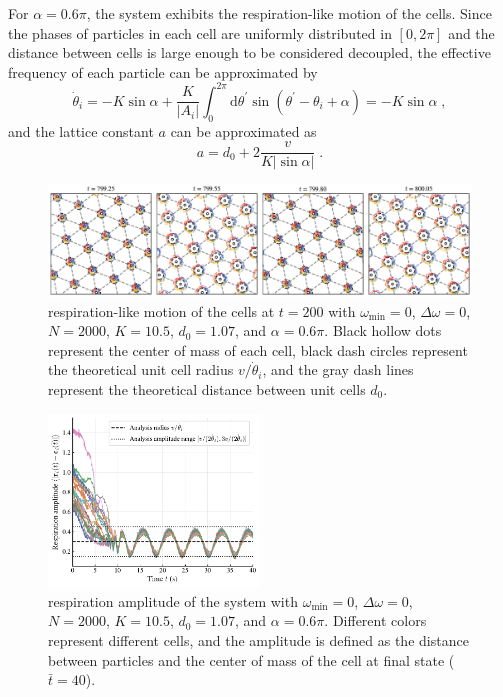 \documentclass{article}
\begin{document}
For $\alpha=0.6\pi$, the system exhibits the respiration-like motion of the cells. Since the phases of particles in each cell are uniformly distributed in $[0, 2\pi]$ and the distance between cells is large enough to be considered decoupled, the effective frequency of each particle can be approximated by
\begin{equation}
    \dot{\theta}_i=-K\sin \alpha +\frac{K}{\left| A_i \right|}\int_0^{2\pi}{\mathrm{d}\theta ^{\prime}\sin \left( \theta ^{\prime}-\theta _i+\alpha \right)}=-K\sin \alpha\;,
\end{equation}
and the lattice constant $a$ can be approximated as 
\begin{equation}
    a=d_0+2\frac{v}{K\left| \sin \alpha \right|}\;.
    \label{eq:latticeConstant}
\end{equation}
\begin{figure}[H]
    \centering
    \includegraphics[width=\textwidth]{./figs/respiration_snapshot.pdf}
    \caption{
        \label{fig:respiration_snapshot}
        respiration-like motion of the cells at $t=200$ with $\omega _{\min}=0$, $\Delta \omega=0$, $N=2000$, $K=10.5$, $d_0=1.07$, and $\alpha=0.6\pi$. Black hollow dots represent the center of mass of each cell, black dash circles represent the theoretical unit cell radius $v/\dot{\theta}_i$, and the gray dash lines represent the theoretical distance between unit cells $d_0$.
    }
\end{figure}
\begin{figure}[H]
    \centering
    \includegraphics[width=0.5\textwidth]{./figs/respiration_amplitude.pdf}
    \caption{
        \label{fig:respiration_amplitude}
        respiration amplitude of the system with $\omega _{\min}=0$, $\Delta \omega=0$, $N=2000$, $K=10.5$, $d_0=1.07$, and $\alpha=0.6\pi$. 
        Different colors represent different cells, and the amplitude is defined as the distance between particles and the center of mass of the cell at final state ($\bar{t}=40$).
    }
\end{figure}
\end{document}
